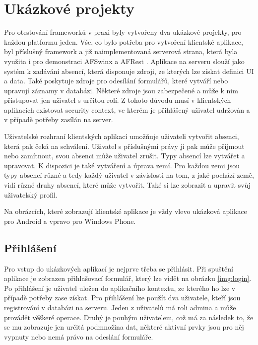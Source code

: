 \section{Ukázkové projekty}
Pro otestování frameworků v praxi byly vytvořeny dva ukázkové projekty, pro každou platformu jeden. Vše, co bylo potřeba pro vytvoření klientské aplikace, byl příslušný framework a již naimplementovaná serverová strana, která byla využita i pro demonstraci AFSwinx a AFRest \cite{tomasek-thesis}. Aplikace na serveru slouží jako systém k zadávání absencí, která disponuje zdroji, ze kterých lze získat definici UI a data. Také poskytuje zdroje pro odesílání formulářů, které vytváří nebo upravují záznamy v databázi. Některé zdroje jsou zabezpečené a může k nim přistupovat jen uživatel s určitou rolí. Z tohoto důvodu musí v klientských aplikacích existovat security context, ve kterém je přihlášený uživatel udržován a v případě potřeby zasílán na server. 

Uživatelské rozhraní klientských aplikací umožňuje uživateli vytvořit absenci, která pak čeká na schválení. Uživatel s příslušnými právy ji pak může přijmout nebo zamítnout, svou absenci může uživatel zrušit. Typy absencí lze vytvářet a upravovat. K dispozici je také vytváření a úprava zemí. Pro každou zemi jsou typy absencí různé a tedy každý uživatel v závislosti na tom, z jaké pochází země, vidí různé druhy absencí, které může vytvořit. Také si lze zobrazit a upravit svůj uživatelský profil.

Na obrázcích, které zobrazují klientské aplikace je vždy vlevo ukázková aplikace pro Android a vpravo pro Windows Phone.

\subsection{Přihlášení}
Pro vstup do ukázkových aplikací je nejprve třeba se přihlásit. Při spuštění aplikace je zobrazen přihlašovací formulář, který lze vidět na obrázku \ref{img:login}. Po přihlášení je uživatel uložen do aplikačního kontextu, ze kterého ho lze v případě potřeby zase získat. Pro přihlášení lze použít dva uživatele, kteří jsou registrování v databázi na serveru. Jeden z uživatelů má roli admina a může provádět věškeré operace. Druhý je pouhým uživatelem, což má za následek to, že se mu zobrazuje jen určitá podmnožina dat, některé aktivní prvky jsou pro něj vypnuty nebo nemá právo na odeslání formuláře.

